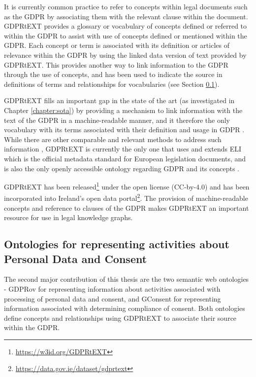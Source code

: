 It is currently common practice to refer to concepts within legal documents such as the GDPR by associating them with the relevant clause within the document. 
GDPRtEXT provides a glossary or vocabulary of concepts defined or referred to within the GDPR to assist with use of concepts defined or mentioned within the GDPR. Each concept or term is associated with its definition or articles of relevance within the GDPR by using the linked data version of text provided by GDPRtEXT. This provides another way to link information to the GDPR through the use of concepts, and has been used to indicate the source in definitions of terms and relationships for vocabularies (see Section \ref{sec:contributions:ontologies}).

GDPRtEXT fills an important gap in the state of the art (as investigated in Chapter \ref{chapter:sota}) by providing a mechanism to link information with the text of the GDPR in a machine-readable manner, and it therefore the only vocabulary with its terms associated with their definition and usage in GDPR .
While there are other comparable and relevant methods to address such information \cite{agarwal_legislative_2018,palmirani_pronto_2018-1}, GDPRtEXT is currently the only one  that uses and extends ELI \cite{ELI_2012} which is the official metadata standard for European legislation documents, and is also the only openly accessible ontology regarding GDPR and its concepts \cite{leone_taking_2019}.

GDPRtEXT has been released\footnote{\url{https://w3id.org/GDPRtEXT}} under the open license (CC-by-4.0) and has been incorporated into Ireland's open data portal\footnote{\url{https://data.gov.ie/dataset/gdprtext}}.
The provision of machine-readable concepts and reference to clauses of the GDPR makes GDPRtEXT an important resource for use in legal knowledge graphs.

\subsection{Ontologies for representing activities about Personal Data and Consent}\label{sec:contributions:ontologies}
The second major contribution of this thesis are the two semantic web ontologies - GDPRov for representing information about activities associated with processing of personal data and consent, and GConsent for representing information associated with determining compliance of consent. Both ontologies define concepts and relationships using GDPRtEXT to associate their source within the GDPR.

